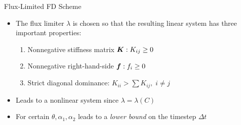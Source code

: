 \documentclass[landscape,pdftex,headrule,footrule]{foils}
\begin{document}
                                                                                
\begin{foil}{Flux-Limited FD Scheme}
  \begin{itemize}
    \item The flux limiter $\lambda$ is chosen so that the resulting linear
          system has three important properties:
    \begin{enumerate}
      \item Nonnegative stiffness matrix $\mbox{\boldmath $K$}: K_{ij} \ge 0$
      \item Nonnegative right-hand-side  $\mbox{\boldmath $f$}: f_i \ge 0$
      \item Strict diagonal dominance: $K_{ii} > \sum K_{ij}, \; i \ne j$
    \end{enumerate}
  \item Leads to a nonlinear system since $\lambda = \lambda(C)$
  \item For certain $\theta, \alpha_1, \alpha_2$ leads to a \emph{lower bound}
        on the timestep $\Delta t$
  \end{itemize}
\end{foil}
\end{document}
